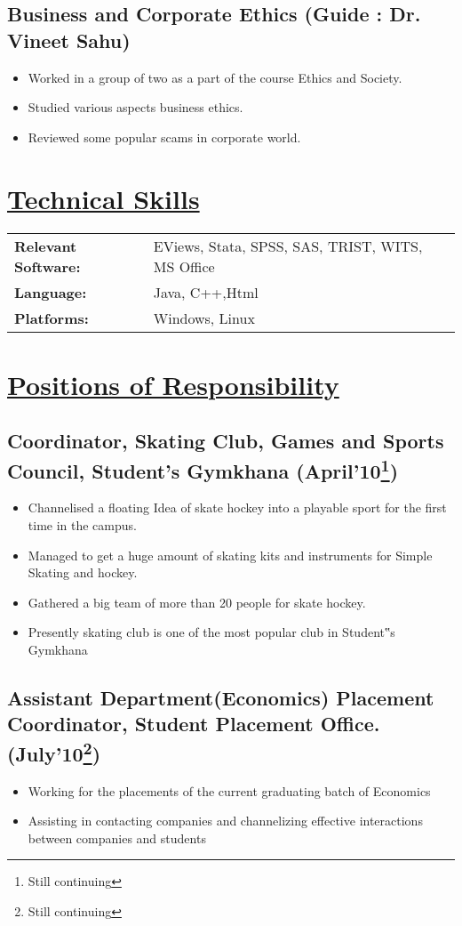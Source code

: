 \documentclass[12pt]{article}
\begin{document}
\subsection*{Business and Corporate Ethics (Guide : Dr. Vineet Sahu)}
\begin{itemize} 
	\item Worked in a group of two as a part of the course Ethics and Society.
	\item Studied various aspects business ethics.
	\item Reviewed some popular scams in corporate world.
\end{itemize}


\section*{\underline {Technical Skills}}
\begin{tabular}{ll}
{\bf Relevant Software:} & EViews, Stata, SPSS, SAS, TRIST, WITS, MS Office\\
{\bf Language:} & Java, C++,Html\\
{\bf Platforms:} & Windows, Linux\\
\end{tabular}

\section*{\underline {Positions of Responsibility}}
\subsection*{Coordinator, Skating Club, Games and Sports Council, Student’s Gymkhana (April’10\footnote{Still continuing})}
\begin{itemize} 
	\item Channelised a floating Idea of skate hockey into a playable sport for the first time in the campus.
	\item Managed to get a huge amount of skating kits and instruments for Simple Skating and hockey.
	\item Gathered a big team of more than 20 people for skate hockey.
	\item Presently skating club is one of the most popular club in Student‟s Gymkhana
\end{itemize}

\subsection*{Assistant Department(Economics) Placement Coordinator, Student Placement Office.(July’10\footnote{Still continuing})}
\begin{itemize}
	\item Working for the placements of the current graduating batch of Economics
	\item Assisting in contacting companies and channelizing effective interactions between companies and students
\end{itemize}
\end{document}
